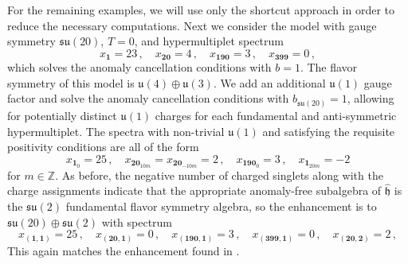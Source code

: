 \documentclass[11pt, a4paper]{article}
\newcommand*{\bbZ}{\ensuremath{\mathbb{Z}}}
\newcommand*{\fkh}{\ensuremath{\mathfrak{h}}}
\newcommand*{\fku}{\ensuremath{\mathfrak{u}}}
\newcommand*{\fksu}{\ensuremath{\mathfrak{su}}}
\begin{document}
For the remaining examples, we will use only the shortcut approach in order to reduce the necessary computations. Next we consider the model with gauge symmetry $\fksu(20)$, $T = 0$, and hypermultiplet spectrum
    \begin{equation}
        x_{\bm{1}} = 23\,, \quad x_{\bm{20}} = 4\,, \quad x_{\bm{190}} = 3\,, \quad x_{\bm{399}} = 0\,,
    \end{equation}
which solves the anomaly cancellation conditions with $b = 1$. The flavor symmetry of this model is $\fku(4) \oplus \fku(3)$. We add an additional $\fku(1)$ gauge factor and solve the anomaly cancellation conditions  with $b_{\fksu(20)} = 1$, allowing for potentially distinct $\fku(1)$ charges for each fundamental and anti-symmetric hypermultiplet. The spectra with non-trivial $\fku(1)$ and satisfying the requisite positivity conditions are all of the form
    \begin{equation}
        x_{\bm{1}_0} = 25\,, \quad x_{\bm{20}_{10 m}} = x_{\bm{20}_{-10 m}} = 2\,, \quad x_{\bm{190}_0} = 3\,, \quad x_{\bm{1}_{20 m}} = -2
    \end{equation}
for $m \in \bbZ$. As before, the negative number of charged singlets along with the charge assignments indicate that the appropriate anomaly-free subalgebra of $\hat{\fkh}$ is the $\fksu(2)$ fundamental flavor symmetry algebra, so the enhancement is to $\fksu(20) \oplus \fksu(2)$ with spectrum
    \begin{equation}
        x_{(\bm{1}, \bm{1})} = 25\,, \quad x_{(\bm{20}, \bm{1})} = 0\,, \quad x_{(\bm{190}, \bm{1})} = 3\,, \quad x_{(\bm{399}, \bm{1})} = 0\,, \quad x_{(\bm{20}, \bm{2})} = 2\,,
    \end{equation}
This again matches the enhancement found in \cite{Raghuram:2020vxm}.
\end{document}
